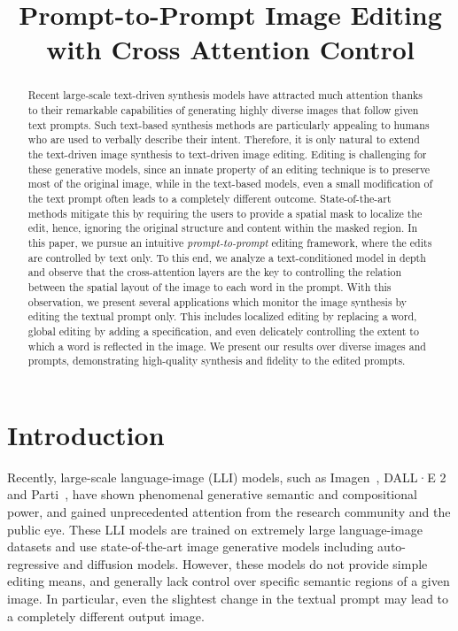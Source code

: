 \title{Prompt-to-Prompt Image Editing with Cross Attention Control}

\begin{abstract}
Recent large-scale text-driven synthesis models have attracted much attention thanks to their remarkable capabilities of generating highly diverse images that follow given text prompts. Such text-based synthesis methods are particularly appealing to humans who are used to verbally describe their intent. Therefore, it is only natural to extend the text-driven image synthesis to text-driven image editing. Editing is challenging for these generative models, since an innate property of an editing technique is to preserve most of the original image, while in the text-based models, even a small modification of the text prompt often leads to a completely different outcome. State-of-the-art methods mitigate this by requiring the users to provide a spatial mask to localize the edit, hence, ignoring the original structure and content within the masked region. In this paper, we pursue an intuitive \emph{prompt-to-prompt} editing framework, where the edits are controlled by text only. To this end, we analyze a text-conditioned model in depth and observe that the cross-attention layers are the key to controlling the relation between the spatial layout of the image to each word in the prompt. With this observation, we present several applications which monitor the image synthesis by editing the textual prompt only. This includes localized editing by replacing a word, global editing by adding a specification, and even delicately controlling the extent to which a word is reflected in the image. We present our results over diverse images and prompts, demonstrating high-quality synthesis and fidelity to the edited prompts.
\end{abstract}

\section{Introduction}

Recently, large-scale language-image (LLI) models, such as Imagen~\cite{saharia2022photorealistic}, DALL·E 2~\cite{ramesh2022hierarchical} and Parti~\cite{yu2022scaling}, have shown phenomenal generative semantic and compositional power, and gained unprecedented attention from the research community and the public eye. These LLI models are trained on extremely large language-image datasets and use state-of-the-art image generative models including auto-regressive and diffusion models. However, these models do not provide simple editing means, and generally lack control over specific semantic regions of a given image. In particular, even the slightest change in the textual prompt may lead to a completely different output image.

